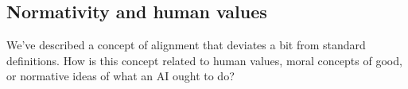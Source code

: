 \documentclass[12pt]{article}
\begin{document}













\subsection{Normativity and human values}

We've described a concept of alignment that deviates a bit from standard definitions. How is this concept related to human values, moral concepts of good, or normative ideas of what an AI ought to do?
\end{document}
